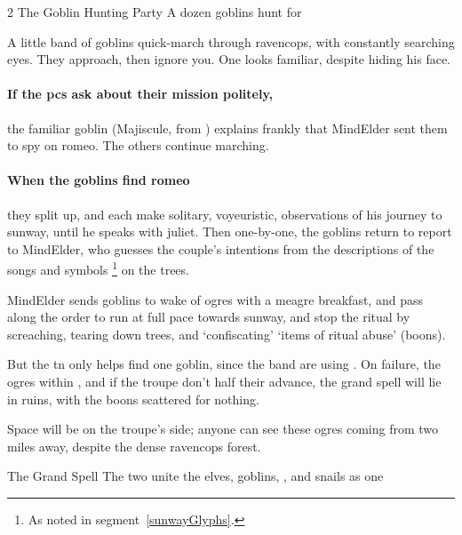 \begin{multicols}{2}
{The Goblin Hunting Party}%
{A dozen goblins hunt for }%

\begin{boxtext}
  A little band of goblins quick-march through \gls{ravencops}, with constantly searching eyes.
  They approach, then ignore you.
  One looks familiar, despite hiding his face.
\end{boxtext}

\paragraph{If the \glspl{pc} ask about their mission politely,}
the familiar goblin (Majiscule, from ) explains frankly that \Gls{MindElder} sent them to spy on \gls{romeo}.
The others continue marching.

\enchantedGoblin

\paragraph{When the goblins find \gls{romeo}}
they split up, and each make solitary, voyeuristic, observations of his journey to \gls{sunway}, until he speaks with \gls{juliet}.
Then one-by-one, the goblins return to report to \gls{MindElder}, who guesses the couple's intentions from the descriptions of the songs and symbols%
\footnote{As noted in \gls{segment}~\vref{sunwayGlyphs}.}
on the trees.

\Gls{MindElder} sends goblins to wake  of \glspl{ogre} with a meagre breakfast, and pass along the order to run at full pace towards \gls{sunway}, and stop the ritual by screaching, tearing down trees, and `confiscating' `items of ritual abuse' (\glspl{boon}).

But the \gls{tn} only helps find one goblin, since the band are using .
On failure, the \glspl{ogre} within , and if the troupe don't half their advance, the grand \gls{spell} will lie in ruins, with the \glspl{boon} scattered for nothing.

Space will be on the troupe's side; anyone can see these \glspl{ogre} coming from two miles away, despite the dense \gls{ravencops} forest.

{The Grand Spell}%
{The two unite the elves, goblins, , and snails as one}%
\label{grandSpell}


\end{multicols}
